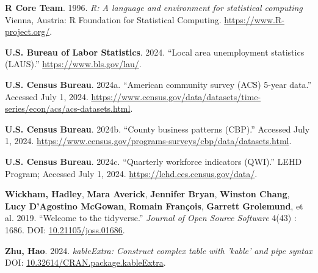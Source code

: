 \documentclass[
]{article}
\newlength{\cslhangindent}
\newenvironment{CSLReferences}[2] %
 {\begin{list}{}{%
  \setlength{\itemindent}{0pt}
  \setlength{\leftmargin}{0pt}
  \setlength{\parsep}{0pt}
  \ifodd #1
   \setlength{\leftmargin}{\cslhangindent}
   \setlength{\itemindent}{-1\cslhangindent}
  \fi
  \setlength{\itemsep}{#2\baselineskip}}}
 {\end{list}}
\begin{document}
\begin{CSLReferences}{1}{0}
\textbf{R Core Team}. 1996. \emph{R: A language and environment for
statistical computing} Vienna, Austria: R Foundation for Statistical
Computing. \url{https://www.R-project.org/}.

\textbf{U.S. Bureau of Labor Statistics}. 2024. {``Local area
unemployment statistics ({LAUS}).''} \url{https://www.bls.gov/lau/}.

\textbf{U.S. Census Bureau}. 2024a. {``American community survey ({ACS})
5-year data.''} Accessed July 1, 2024.
\url{https://www.census.gov/data/datasets/time-series/econ/acs/acs-datasets.html}.

\textbf{U.S. Census Bureau}. 2024b. {``County business patterns
({CBP}).''} Accessed July 1, 2024.
\url{https://www.census.gov/programs-surveys/cbp/data/datasets.html}.

\textbf{U.S. Census Bureau}. 2024c. {``Quarterly workforce indicators
({QWI}).''} LEHD Program; Accessed July 1, 2024.
\url{https://lehd.ces.census.gov/data/}.

\textbf{Wickham, Hadley}, \textbf{Mara Averick}, \textbf{Jennifer
Bryan}, \textbf{Winston Chang}, \textbf{Lucy D'Agostino McGowan},
\textbf{Romain François}, \textbf{Garrett Grolemund}, et al. 2019.
{``Welcome to the {tidyverse}.''} \emph{Journal of Open Source Software}
4(43) : 1686. DOI:
\href{https://doi.org/10.21105/joss.01686}{10.21105/joss.01686}.

\textbf{Zhu, Hao}. 2024. \emph{kableExtra: Construct complex table with
'kable' and pipe syntax} DOI:
\href{https://doi.org/10.32614/CRAN.package.kableExtra}{10.32614/CRAN.package.kableExtra}.

\end{CSLReferences}
\end{document}
